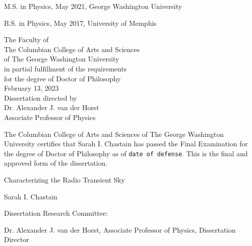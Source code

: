 \documentclass[12pt]{article}
\begin{document}
\thispagestyle{empty}
\vspace*{1in}
\begin{center}
\centerline{M.S. in Physics, May 2021, George Washington University}
\centerline{B.S. in Physics, May 2017, University of Memphis}\vspace*{24pt}
\begin{center}
The Faculty of\\The Columbian College of Arts and Sciences \\ of The George
Washington University\\ in partial fulfillment of the requirements\\ for the degree
of Doctor of Philosophy\\[36pt]
February 13, 2023\\[36pt] %
Dissertation directed by\\[\baselineskip]
Dr. Alexander J. van der Horst\\
Associate Professor of Physics\\[\baselineskip]
\end{center}
\end{center}
\pagestyle{plain}
\setcounter{page}{1}
\newpage
\begin{doublespace}
\noindent
The Columbian College of Arts and Sciences of The George Washington University certifies that Sarah I. Chastain has passed the Final Examination for the degree of Doctor of Philosophy as of \texttt{date of defense}. This is the final and approved form of the dissertation.
\end{doublespace}
\vspace{12pt}
\begin{center}
Characterizing the Radio Transient Sky

\vspace*{36pt}
Sarah I. Chastain
\vspace{24pt}
\end{center}
Dissertation Research Committee:
\vspace{12pt}

\indent Dr. Alexander J. van der Horst, Associate Professor of Physics, Dissertation Director
\vspace{12pt}
\end{document}

